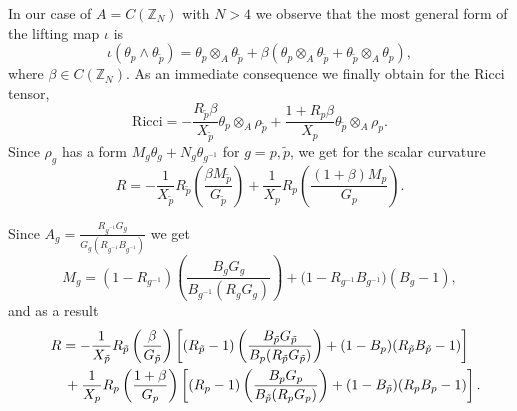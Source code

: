 \documentclass[pdftex]{sigma}
\numberwithin{equation}{section}
\newcommand{\ip}{{\tilde{p}}}
\begin{document}
In our case of $A=C(\mathbb{Z}_N)$ with $N>4$ we observe that the most general form of the lifting map $\iota$ is
\begin{equation*}
\iota(\theta_p\wedge \theta_{\ip})=\theta_p\otimes_A\theta_{\ip}+\beta (\theta_p\otimes_A\theta_{\ip}+\theta_{\ip}\otimes_A\theta_p),
\end{equation*}
where $\beta\in C(\mathbb{Z}_N)$. As an immediate consequence we finally obtain for the Ricci tensor,
\begin{equation*}
\mathrm{Ricci}=-\frac{R_{\ip}\beta}{X_{\ip}}\theta_p\otimes_A\rho_{\ip}+\frac{1+R_p\beta}{X_p}\theta_{\ip}\otimes_A\rho_p.
\end{equation*}
Since $\rho_g$ has a form $M_g\theta_g+N_g\theta_{g^{-1}}$ for $g=p,\ip$, we get for the scalar curvature
\begin{equation*}
R=-\frac{1}{X_{\ip}}R_{\ip}\left(\frac{\beta M_{\ip}}{G_{\ip}}\right)+\frac{1}{X_p}R_p\left(\frac{(1+\beta)M_p}{G_p}\right).
\end{equation*}

Since $A_g=\frac{R_{g^{-1}}G_{g}}{G_g(R_{g^{-1}}B_{g^{-1}})}$ we get
\begin{equation*}
M_g=(1-R_{g^{-1}})\left(\frac{B_gG_g}{B_{g^{-1}}(R_gG_g)}\right)+\big(1-R_{g^{-1}}B_{g^{-1}}\big)(B_g-1),
\end{equation*}
and as a result
\begin{gather*}
R= -\frac{1}{X_{\ip}}R_{\ip}\left(\frac{\beta}{G_{\ip}}\right)\left[(R_{\ip}-1)\left(\frac{B_{\ip}G_{\ip}}{B_p(R_{\ip}G_{\ip})}\right) +(1-B_p)(R_{\ip}B_{\ip}-1)\right] \\
\hphantom{R=}{} + \frac{1}{X_{p}}R_{p}\left(\frac{1+\beta}{G_{p}}\right)\left[(R_{p}-1)\left(\frac{B_{p}G_{p}}{B_{\ip}(R_{p}G_{p})}\right) +(1-B_{\ip})(R_{p}B_{p}-1)\right].
\end{gather*}
\end{document}
